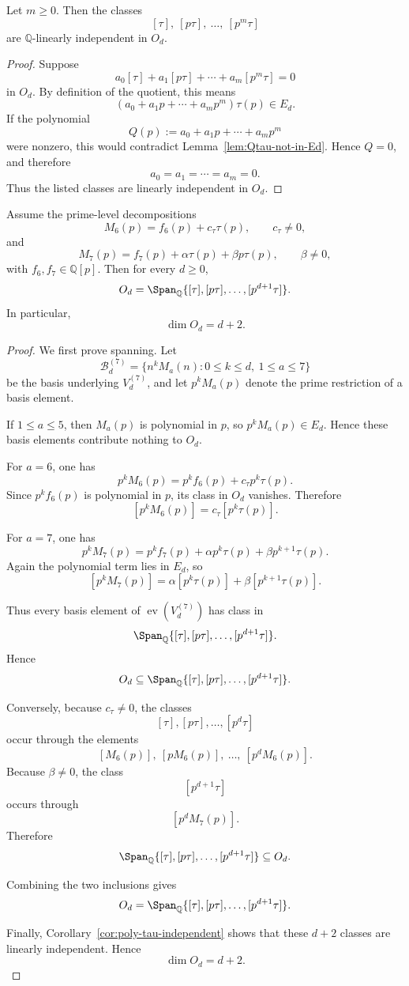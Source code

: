 \begin{corollary}\label{cor:poly-tau-independent}
Let $m\ge 0$. Then the classes
\[
[\tau],\ [p\tau],\ \dots,\ [p^m\tau]
\]
are $\mathbb Q$-linearly independent in $O_d$.
\end{corollary}

\begin{proof}
Suppose
\[
a_0[\tau]+a_1[p\tau]+\cdots+a_m[p^m\tau]=0
\]
in $O_d$. By definition of the quotient, this means
\[
(a_0+a_1p+\cdots+a_mp^m)\tau(p)\in E_d.
\]
If the polynomial
\[
Q(p):=a_0+a_1p+\cdots+a_mp^m
\]
were nonzero, this would contradict Lemma~\ref{lem:Qtau-not-in-Ed}. Hence $Q=0$, and therefore
\[
a_0=a_1=\cdots=a_m=0.
\]
Thus the listed classes are linearly independent in $O_d$.
\end{proof}

\begin{proposition}\label{prop:Od-full-structure}
Assume the prime-level decompositions
\[
M_6(p)=f_6(p)+c_\tau\tau(p),
\qquad c_\tau\neq 0,
\]
and
\[
M_7(p)=f_7(p)+\alpha\tau(p)+\beta p\tau(p),
\qquad \beta\neq 0,
\]
with $f_6,f_7\in\mathbb Q[p]$. Then for every $d\ge 0$,
\[
O_d=\Span_{\mathbb Q}\{[\tau],[p\tau],\dots,[p^{d+1}\tau]\}.
\]
In particular,
\[
\dim O_d=d+2.
\]
\end{proposition}

\begin{proof}
We first prove spanning. Let
\[
\mathcal B_d^{(7)}=\{n^kM_a(n):0\le k\le d,\ 1\le a\le 7\}
\]
be the basis underlying $V_d^{(7)}$, and let $p^kM_a(p)$ denote the prime restriction of a basis element.

If $1\le a\le 5$, then $M_a(p)$ is polynomial in $p$, so $p^kM_a(p)\in E_d$. Hence these basis elements contribute nothing to $O_d$.

For $a=6$, one has
\[
p^kM_6(p)=p^k f_6(p)+c_\tau p^k\tau(p).
\]
Since $p^k f_6(p)$ is polynomial in $p$, its class in $O_d$ vanishes. Therefore
\[
[p^kM_6(p)]=c_\tau [p^k\tau(p)].
\]

For $a=7$, one has
\[
p^kM_7(p)=p^k f_7(p)+\alpha p^k\tau(p)+\beta p^{k+1}\tau(p).
\]
Again the polynomial term lies in $E_d$, so
\[
[p^kM_7(p)]=\alpha [p^k\tau(p)]+\beta [p^{k+1}\tau(p)].
\]

Thus every basis element of $\operatorname{ev}(V_d^{(7)})$ has class in
\[
\Span_{\mathbb Q}\{[\tau],[p\tau],\dots,[p^{d+1}\tau]\}.
\]
Hence
\[
O_d\subseteq \Span_{\mathbb Q}\{[\tau],[p\tau],\dots,[p^{d+1}\tau]\}.
\]

Conversely, because $c_\tau\neq 0$, the classes
\[
[\tau],[p\tau],\dots,[p^d\tau]
\]
occur through the elements
\[
[M_6(p)],\ [pM_6(p)],\ \dots,\ [p^dM_6(p)].
\]
Because $\beta\neq 0$, the class
\[
[p^{d+1}\tau]
\]
occurs through
\[
[p^dM_7(p)].
\]
Therefore
\[
\Span_{\mathbb Q}\{[\tau],[p\tau],\dots,[p^{d+1}\tau]\}\subseteq O_d.
\]

Combining the two inclusions gives
\[
O_d=\Span_{\mathbb Q}\{[\tau],[p\tau],\dots,[p^{d+1}\tau]\}.
\]

Finally, Corollary~\ref{cor:poly-tau-independent} shows that these $d+2$ classes are linearly independent. Hence
\[
\dim O_d=d+2.
\]
\end{proof}
